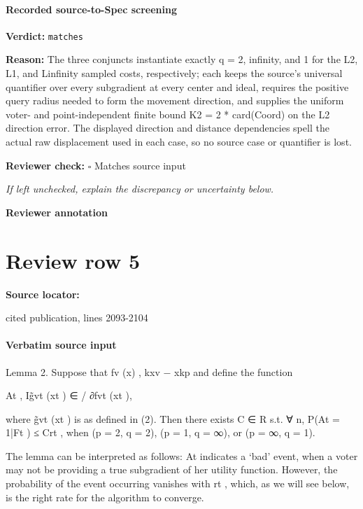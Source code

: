\documentclass[10pt]{article}
\newcommand{\reviewerbox}{%
  \par\noindent\fbox{\parbox{0.96\linewidth}{\rule{0pt}{0.38in}}}\par
}
\newcommand{\reviewmatch}[1]{%
  \par\noindent\textbf{Reviewer check:} $\square$\; #1\par
  \noindent\emph{If left unchecked, explain the discrepancy or uncertainty below.}\par
}
\begin{document}
\paragraph{Recorded source-to-Spec screening}
\textbf{Verdict:} \texttt{matches}
\\
{\raggedright
\textbf{Reason:} The three conjuncts instantiate exactly q = 2, infinity, and 1 for the L2, L1, and Linfinity sampled costs, respectively;\allowbreak{} each keeps the source's universal quantifier over every subgradient at every center and ideal, requires the positive query radius needed to form the movement direction, and supplies the uniform voter-\allowbreak{} and point-\allowbreak{}independent finite bound K2 = 2 * card(Coord) on the L2 direction error.\allowbreak{} The displayed direction and distance dependencies spell the actual raw displacement used in each case, so no source case or quantifier is lost.\allowbreak{}
\par}
\reviewmatch{Matches source input}
\noindent\textbf{Reviewer annotation}\par
\reviewerbox
\clearpage
\hypertarget{source-claim-50059dcbca6a7d66}{}
\section*{Review row 5}
\textbf{Source locator:} {\footnotesize\raggedright cited publication, lines 2093-\allowbreak{}2104\par}
\paragraph{Verbatim source input}
\begin{ReviewVerbatim}
Lemma 2. Suppose that fv (x) , kxv − xkp and define the function

                                    At , I{g̃vt (xt ) ∈
                                                      / ∂fvt (xt )},

where g̃vt (xt ) is as defined in (2). Then there exists C ∈ R s.t. ∀ n, P(At = 1|Ft ) ≤ Crt ,
when (p = 2, q = 2), (p = 1, q = ∞), or (p = ∞, q = 1).

The lemma can be interpreted as follows: At indicates a `bad' event, when a voter may not
be providing a true subgradient of her utility function. However, the probability of the event
occurring vanishes with rt , which, as we will see below, is the right rate for the algorithm
to converge.
\end{ReviewVerbatim}
\end{document}
